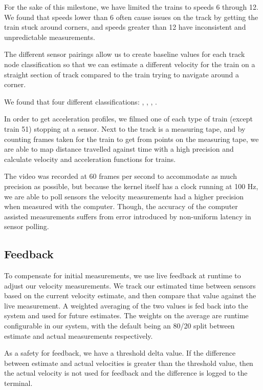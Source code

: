 \documentclass[pdftex,10pt,a4paper]{article}
\begin{document}
For the sake of this milestone, we have limited the trains to speeds 6
through 12. We found that speeds lower than 6 often cause issues on
the track by getting the train stuck around corners, and speeds
greater than 12 have inconsistent and unpredictable measurements.

The different sensor pairings allow us to create baseline values for
each track node classification so that we can estimate a different
velocity for the train on a straight section of track compared to the
train trying to navigate around a corner.

We found that four different classifications: ,
, , .

In order to get acceleration profiles, we filmed one of each type of
train (except train 51) stopping at a sensor. Next to the track is a
measuring tape, and by counting frames taken for the train to get from
points on the measuring tape, we are able to map distance travelled
against time with a high precision and calculate velocity and
acceleration functions for trains.

The video was recorded at 60 frames per second to accommodate as much
precision as possible, but because the kernel itself has a clock
running at 100 Hz, we are able to poll sensors the velocity
measurements had a higher precision when measured with the
computer. Though, the accuracy of the computer assisted measurements
suffers from error introduced by non-uniform latency in sensor polling.

\subsection*{Feedback}

To compensate for initial measurements, we use live feedback at runtime
to adjust our velocity measurements. We track our estimated time
between sensors based on the current velocity estimate, and then
compare that value against the live measurement. A weighted averaging of
the two values is fed back into the system and used for future estimates.
The weights on the average are runtime configurable in our system, with
the default being an 80/20 split between estimate and actual measurements
respectively.

As a safety for feedback, we have a threshold delta value. If the
difference between estimate and actual velocities is greater than the
threshold value, then the actual velocity is not used for feedback and
the difference is logged to the terminal.
\end{document}
